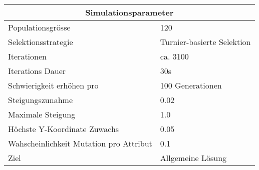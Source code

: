 
    \begin{tabular}{ | l | l | }
      \hline
      \multicolumn{2}{|c|}{Simulationsparameter} \\
      \hline
      Populationsgrösse & 120 \\ \hline
      Selektionsstrategie & Turnier-basierte Selektion \\ \hline
      Iterationen & ca. 3100 \\ \hline
      Iterations Dauer & 30s \\ \hline
      Schwierigkeit erhöhen pro & 100 Generationen \\ \hline
      Steigungszunahme & 0.02 \\ \hline
      Maximale Steigung & 1.0 \\ \hline
      Höchste Y-Koordinate Zuwachs & 0.05 \\ \hline
      Wahscheinlichkeit Mutation pro Attribut & 0.1 \\ \hline
      Ziel & Allgemeine Lösung \\ \hline
    \end{tabular}
